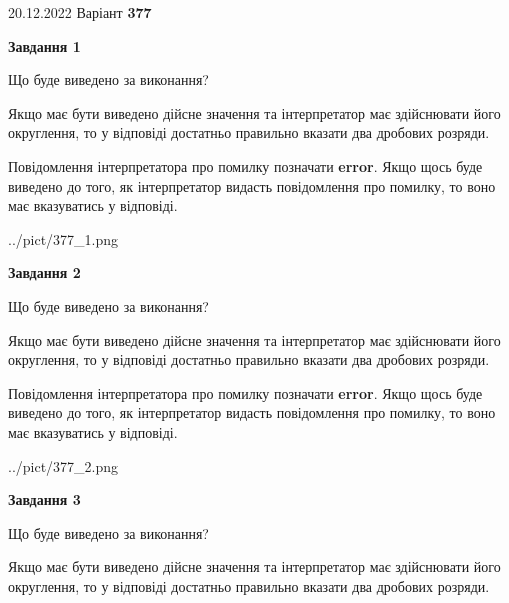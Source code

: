 \documentclass[12pt, ukrainian]{article}
\begin{document}
{20.12.2022 Варіант \No \textbf { 377 }\par}
{
\begin {Large}

{\begin {center}\textbf{Завдання 1}\end {center}}\par
Що буде виведено за виконання? \par

Якщо має бути виведено дійсне значення та інтерпретатор має здійснювати його округлення, 
то у відповіді достатньо правильно вказати два дробових розряди.

Повідомлення інтерпретатора про помилку позначати \textbf{error}.
Якщо щось буде виведено до того, як інтерпретатор видасть повідомлення про помилку, 
то воно має вказуватись у відповіді. \par

\begin{center}
	{../pict/377_1.png}
\end{center}
\newpage

{\begin {center}\textbf{Завдання 2}\end {center}}\par
Що буде виведено за виконання? \par

Якщо має бути виведено дійсне значення та інтерпретатор має здійснювати його округлення, 
то у відповіді достатньо правильно вказати два дробових розряди.

Повідомлення інтерпретатора про помилку позначати \textbf{error}.
Якщо щось буде виведено до того, як інтерпретатор видасть повідомлення про помилку, 
то воно має вказуватись у відповіді. \par

\begin{center}
	{../pict/377_2.png}
\end{center}
\newpage

{\begin {center}\textbf{Завдання 3}\end {center}}\par
Що буде виведено за виконання? \par

Якщо має бути виведено дійсне значення та інтерпретатор має здійснювати його округлення, 
то у відповіді достатньо правильно вказати два дробових розряди.


\end{Large}}
\end{document}
